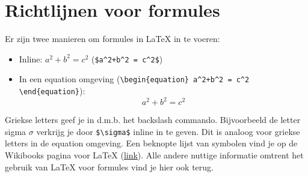 \chapter{Richtlijnen voor formules}

Er zijn twee manieren om formules in LaTeX in te voeren:

\begin{itemize}
	\item Inline: $a^2+b^2 = c^2$ (\verb|$a^2+b^2 = c^2$|)
	\item In een equation omgeving 	(\verb|\begin{equation}	a^2+b^2 = c^2	\end{equation}|):
	\begin{equation}
		a^2+b^2 = c^2
	\end{equation}

\end{itemize}

Griekse letters geef je in d.m.b. het backslash commando. Bijvoorbeeld de letter sigma $\sigma$ verkrijg je door \verb|$\sigma$| inline in te geven. Dit is analoog voor griekse letters in de equation omgeving. Een beknopte lijst van symbolen vind je op de Wikibooks pagina voor LaTeX (\href{https://nl.wikibooks.org/wiki/LaTeX/Wiskundige_formules}{link}). Alle andere nuttige informatie omtrent het gebruik van LaTeX voor formules vind je hier ook terug.
\cleardoublepage